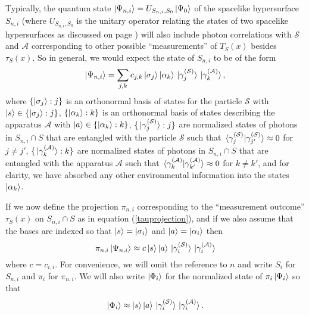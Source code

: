 Typically, the quantum state $\ket{\Psi_{n,i}}=U_{S_{n,i},S_0}\ket{\Psi_0}$ of the spacelike hypersurface $S_{n,i}$ (where  $U_{S_{n,i},S_0}$ is the unitary operator relating the states of two spacelike hypersurfaces as discussed on page \pageref{SchwingerUnitaryOP}) will also include photon correlations with $\mathcal{S}$ and $\mathcal{A}$ corresponding to other possible ``measurements'' of $T_S(x)$ besides $\tau_S(x)$. So in general, we would expect the state of $S_{n,i}$ to be of the form
$$ \ket{\Psi_{n,i}}=\sum_{j,k}c_{j,k}\ket{\sigma_j}\ket{\alpha_k}\ket*{\gamma_j^{(\mathcal{S})}}\ket*{\gamma_k^{(\mathcal{A})}},$$
where $\{\ket{\sigma_j}:j\}$ 
is an orthonormal basis of states for the particle $\mathcal{S}$ with $\ket{s}\in\{\ket{\sigma_j}:j\}$,   $\{\ket{\alpha_k}:k\}$ 
is an orthonormal basis of states describing the apparatus $\mathcal{A}$ with $\ket{a}\in\{\ket{\alpha_k}:k\}$,  $\{\ket*{\gamma_j^{(\mathcal{S})}}:j\}$ 
are normalized states of photons in $S_{n,i}\cap S$ that are entangled with the particle $\mathcal{S}$ such that $\ip*{\gamma_j^{(\mathcal{S})}}{\gamma_{j'}^{(\mathcal{S})}}\approx 0$ for $j\neq j'$,   $\{\ket*{\gamma_k^{(\mathcal{A})}}:k\}$  are normalized states of photons in $S_{n,i}\cap S$ that are entangled with the apparatus $\mathcal{A}$ such that $\ip*{\gamma_k^{(\mathcal{A})}}{\gamma_{k'}^{(\mathcal{A})}}\approx 0$ for $k\neq k'$, and for clarity, we have absorbed any other environmental information into the states $\ket{\alpha_k}$. 

If we now define the projection $\pi_{n,i}$ corresponding to the ``measurement outcome''  $\tau_S(x)$ on $S_{n,i}\cap S$ as in equation (\ref{tauprojection}), and if we also assume that the bases are indexed so that $\ket{s}=\ket{\sigma_i}$
 and $\ket{a}=\ket{\alpha_i}$ then
\begin{equation}\label{piphi}
	\pi_{n,i}\ket{\Psi_{n,i}}\approx c\ket{s}\ket{a}\ket*{\gamma_i^{(\mathcal{S})}}\ket*{\gamma_i^{(\mathcal{A})}}
\end{equation}
 where $c=c_{i,i}$. For convenience, we will omit the reference to $n$ and write $S_i$ for $S_{n,i}$ and $\pi_i$ for $\pi_{n,i}$. We will also write $\ket{\Phi_i}$ for the normalized state of $\pi_i\ket{\Psi_i}$ so that 
 \begin{equation}\label{phii}
	\ket{\Phi_i}\approx \ket{s}\ket{a}\ket*{\gamma_i^{(\mathcal{S})}}\ket*{\gamma_i^{(\mathcal{A})}}.
\end{equation}

